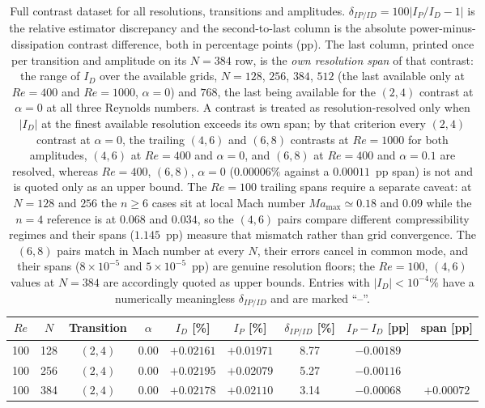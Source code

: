 \begin{table}[!htbp]
\footnotesize
\centering
\renewcommand{\arraystretch}{0.92}
\setlength{\tabcolsep}{3.5pt}
\caption{Full contrast dataset for all resolutions, transitions and amplitudes. $\delta_{IP/ID}=100|I_P/I_D-1|$ is the relative estimator discrepancy and the second-to-last column is the absolute power-minus-dissipation contrast difference, both in percentage points (pp). The last column, printed once per transition and amplitude on its $N=384$ row, is the \emph{own resolution span} of that contrast: the range of $I_D$ over the available grids, $N=128$, $256$, $384$, $512$ (the last available only at $Re=400$ and $Re=1000$, $\alpha=0$) and $768$, the last being available for the $(2,4)$ contrast at $\alpha=0$ at all three Reynolds numbers. A contrast is treated as resolution-resolved only when $|I_D|$ at the finest available resolution exceeds its own span; by that criterion every $(2,4)$ contrast at $\alpha=0$, the trailing $(4,6)$ and $(6,8)$ contrasts at $Re=1000$ for both amplitudes, $(4,6)$ at $Re=400$ and $\alpha=0$, and $(6,8)$ at $Re=400$ and $\alpha=0.1$ are resolved, whereas $Re=400$, $(6,8)$, $\alpha=0$ ($0.00006\%$ against a $0.00011$~pp span) is not and is quoted only as an upper bound. The $Re=100$ trailing spans require a separate caveat: at $N=128$ and $256$ the $n\ge6$ cases sit at local Mach number $Ma_{\max}\simeq 0.18$ and $0.09$ while the $n=4$ reference is at $0.068$ and $0.034$, so the $(4,6)$ pairs compare different compressibility regimes and their spans ($1.145$~pp) measure that mismatch rather than grid convergence. The $(6,8)$ pairs match in Mach number at every $N$, their errors cancel in common mode, and their spans ($8\times10^{-5}$ and $5\times10^{-5}$~pp) are genuine resolution floors; the $Re=100$, $(4,6)$ values at $N=384$ are accordingly quoted as upper bounds. Entries with $|I_D|<10^{-4}\%$ have a numerically meaningless $\delta_{IP/ID}$ and are marked ``--''.}
\label{supptab:contrasts}
\begin{tabular}{@{}ccccccccc@{}}
\hline
$Re$ & $N$ & Transition & $\alpha$ & $I_D$ [\%] & $I_P$ [\%] & $\delta_{IP/ID}$ [\%] & $I_P-I_D$ [pp] & span [pp] \\
\hline
100  & 128 & $(2,4)$ & 0.00 & $+0.02161$ & $+0.01971$ &  8.77 & $-0.00189$ &  \\
100  & 256 & $(2,4)$ & 0.00 & $+0.02195$ & $+0.02079$ &  5.27 & $-0.00116$ &  \\
100  & 384 & $(2,4)$ & 0.00 & $+0.02178$ & $+0.02110$ &  3.14 & $-0.00068$ & $+0.00072$ \\

\end{tabular}
\end{table}
